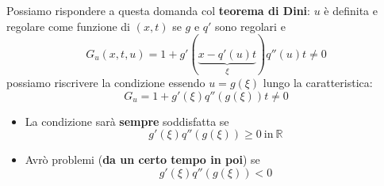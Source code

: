 Possiamo rispondere a questa domanda col \textbf{teorema di Dini}: $u$ è definita e regolare come funzione di $(x,t)$ se $g$ e $q'$ sono regolari e
\begin{equation*}
    G_{u}(x,t,u) =1+g'(\underbrace{x-q'(u) t}_{\xi }) q''(u) t\neq 0
\end{equation*}
possiamo riscrivere la condizione essendo $\displaystyle u=g(\xi)$ lungo la caratteristica:
\begin{equation}
    \boxed{G_{u} =1+g'(\xi) q''(g(\xi)) t\neq 0}
\end{equation}
\begin{itemize}
    \item La condizione sarà \textbf{sempre} soddisfatta se
          \begin{equation*}
              g'(\xi) q''(g(\xi)) \geq 0\ \text{in} \ \mathbb{R}
              \label{eq:condizione-tutto-bene}
          \end{equation*}
    \item Avrò problemi (\textbf{da un certo tempo in poi}) se
          \begin{equation*}
              g'(\xi) q''(g(\xi)) < 0
          \end{equation*}
\end{itemize}
